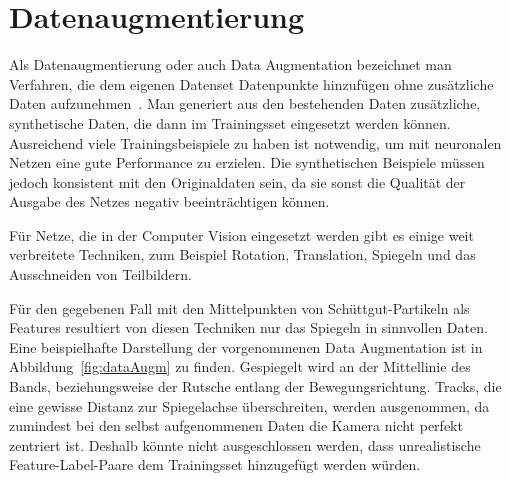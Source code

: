 


\section{Datenaugmentierung}




Als Datenaugmentierung oder auch Data Augmentation bezeichnet man Verfahren, die dem eigenen Datenset Datenpunkte hinzufügen ohne zusätzliche Daten aufzunehmen~\cite[Kapitel 7.4]{Goodfellow-et-al-2016}.
Man generiert aus den bestehenden Daten zusätzliche, synthetische Daten, die dann im Trainingsset eingesetzt werden können.
Ausreichend viele Trainingsbeispiele zu haben ist notwendig, um mit neuronalen Netzen eine gute Performance zu erzielen.
Die synthetischen Beispiele müssen jedoch konsistent mit den Originaldaten sein, da sie sonst die Qualität der Ausgabe des Netzes negativ beeinträchtigen können.

Für Netze, die in der Computer Vision eingesetzt werden gibt es einige weit verbreitete Techniken,
zum Beispiel Rotation, Translation, Spiegeln und das Ausschneiden von Teilbildern.

Für den gegebenen Fall mit den Mittelpunkten von Schüttgut-Partikeln als Features resultiert von diesen Techniken nur das Spiegeln in sinnvollen Daten.
Eine beispielhafte Darstellung der vorgenommenen Data Augmentation ist in Abbildung~\ref{fig:dataAugm} zu finden.
Gespiegelt wird an der Mittellinie des Bands, beziehungsweise der Rutsche entlang der Bewegungsrichtung.
Tracks, die eine gewisse Distanz zur Spiegelachse überschreiten, werden ausgenommen, da zumindest bei den selbst aufgenommenen Daten 
die Kamera nicht perfekt zentriert ist.
Deshalb könnte nicht ausgeschlossen werden, 
dass unrealistische Feature-Label-Paare dem Trainingsset hinzugefügt werden würden.


